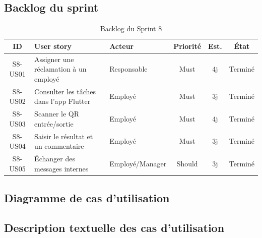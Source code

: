 \subsection{Backlog du sprint}
\begin{table}[H]
\centering
\caption{Backlog du Sprint 8}
\small
\begin{tabularx}{\textwidth}{|c|X|p{2.2cm}|c|c|c|}
\hline
\textbf{ID} & \textbf{User story} & \textbf{Acteur} & \textbf{Priorité} & \textbf{Est.} & \textbf{État} \\ \hline
S8-US01 & Assigner une réclamation à un employé & Responsable & Must & 4j & Terminé \\ \hline
S8-US02 & Consulter les tâches dans l'app Flutter & Employé & Must & 3j & Terminé \\ \hline
S8-US03 & Scanner le QR entrée/sortie & Employé & Must & 4j & Terminé \\ \hline
S8-US04 & Saisir le résultat et un commentaire & Employé & Must & 3j & Terminé \\ \hline
S8-US05 & Échanger des messages internes & Employé/Manager & Should & 3j & Terminé \\ \hline
\end{tabularx}
\end{table}

\subsection{Diagramme de cas d'utilisation}

\subsection{Description textuelle des cas d'utilisation}

